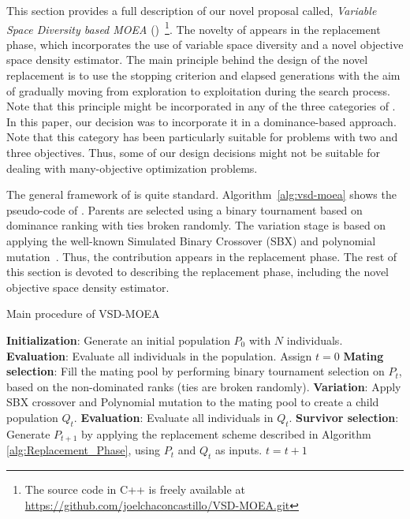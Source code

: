 
This section provides a full description of our novel proposal called, \textit{Variable Space Diversity based MOEA} 
(\VSDMOEA{})~\footnote{The source code in C++ is freely available at \url{https://github.com/joelchaconcastillo/VSD-MOEA.git}}.
%
The novelty of \VSDMOEA{} appears in the replacement phase, which incorporates
the use of variable space diversity and a novel objective space density estimator. 
%
The main principle behind the design of the novel replacement is to use the stopping criterion and 
elapsed generations with the aim of gradually moving from exploration to exploitation during the search process.
%
Note that this principle might be incorporated in any of the three categories of \MOEAS{}.
%
In this paper, our decision was to incorporate it in a dominance-based approach.
%
Note that this category has been particularly suitable for problems with two and three objectives.
%
Thus, some of our design decisions might not be suitable for dealing with many-objective optimization problems.

The general framework of \VSDMOEA{} is quite standard.
%
Algorithm~\ref{alg:vsd-moea} shows the pseudo-code of \VSDMOEA{}.
%
Parents are selected using a binary tournament based on dominance ranking with ties broken randomly.
%
The variation stage is based on applying the well-known Simulated Binary Crossover (SBX) 
and polynomial mutation~\cite{Joel:SBX1994, Joel:Mutation}.
%
Thus, the contribution appears in the replacement phase.
%
The rest of this section is devoted to describing the replacement phase, including the novel objective space density 
estimator.

\begin{algorithm}[t]
	\caption{Main procedure of VSD-MOEA} 
	\begin{small}
\begin{algorithmic}[1]
 	\STATE \textbf{Initialization}: Generate an initial population $P_0$ with $N$ individuals.
	\STATE \textbf{Evaluation}: Evaluate all individuals in the population.
	\STATE Assign $t=0$
	   \STATE \textbf{Mating selection}: Fill the mating pool by performing binary tournament selection on $P_t$, 
		 based on the non-dominated ranks (ties are broken randomly).
	   \STATE \textbf{Variation}: Apply SBX crossover and Polynomial mutation to the mating pool to create a child population $Q_t$.
		 \STATE \textbf{Evaluation}: Evaluate all individuals in $Q_t$.
	   \STATE \textbf{Survivor selection}: Generate $P_{t+1}$ by applying the replacement scheme 
		 described in Algorithm \ref{alg:Replacement_Phase}, using $P_t$ and $Q_t$ as inputs.
	   \STATE $t=t+1$
	\ENDWHILE
	\end{algorithmic}
	\end{small}
\label{alg:vsd-moea}
\end{algorithm}


